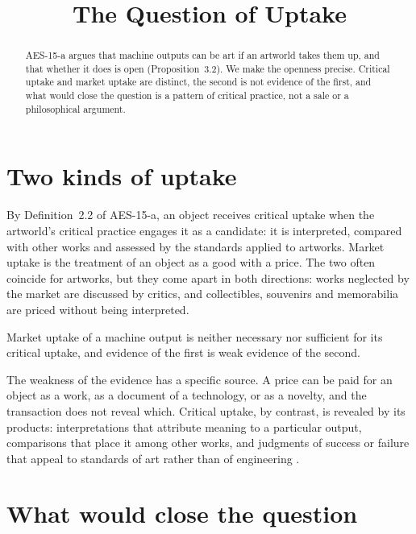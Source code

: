 \documentclass{situationist-preprint}
\title{The Question of Uptake}
\begin{document}
\maketitle
\vspace{-1em}

\begin{abstract}
AES-15-a argues that machine outputs can be art if an artworld takes them up, and that whether it does is open (Proposition~3.2). We make the openness precise. Critical uptake and market uptake are distinct, the second is not evidence of the first, and what would close the question is a pattern of critical practice, not a sale or a philosophical argument.
\end{abstract}

\section{Two kinds of uptake}

By Definition~2.2 of AES-15-a, an object receives critical uptake when the artworld's critical practice engages it as a candidate: it is interpreted, compared with other works and assessed by the standards applied to artworks. Market uptake is the treatment of an object as a good with a price. The two often coincide for artworks, but they come apart in both directions: works neglected by the market are discussed by critics, and collectibles, souvenirs and memorabilia are priced without being interpreted.

\begin{proposition}\label{p:distinct}
Market uptake of a machine output is neither necessary nor sufficient for its critical uptake, and evidence of the first is weak evidence of the second.
\end{proposition}

The weakness of the evidence has a specific source. A price can be paid for an object as a work, as a document of a technology, or as a novelty, and the transaction does not reveal which. Critical uptake, by contrast, is revealed by its products: interpretations that attribute meaning to a particular output, comparisons that place it among other works, and judgments of success or failure that appeal to standards of art rather than of engineering \citep{Danto1964,Dickie1974}.

\section{What would close the question}
\end{document}
